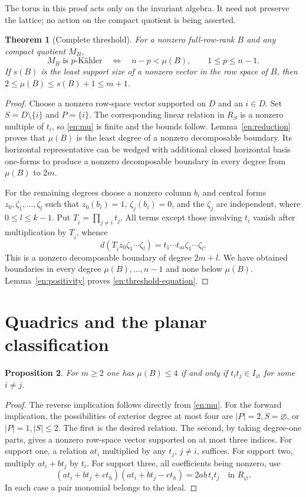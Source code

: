 \documentclass[12pt]{amsart}
\newcommand{\thmword}{Theorem}
\newcommand{\propword}{Proposition}
\newtheorem{thm}{\thmword}[section]
\newtheorem{prop}[thm]{\propword}
\theoremstyle{definition}
\theoremstyle{remark}
\numberwithin{equation}{section}
\begin{document}
The torus in this proof acts only on the invariant algebra. It need not
preserve the lattice; no action on the compact quotient is being asserted.

\begin{thm}[Complete threshold]\label{en:threshold}
For a nonzero full-row-rank $B$ and any compact quotient $M_B$,
\begin{equation}\label{en:threshold-equation}
 M_B\text{ is }p\text{-K\"ahler}
 \quad\Longleftrightarrow\quad n-p<\mu(B),\qquad 1\leq p\leq n-1.
\end{equation}
If $s(B)$ is the least support size of a nonzero vector in the row space
of $B$, then $2\leq\mu(B)\leq s(B)+1\leq m+1$.
\end{thm}
\begin{proof}
Choose a nonzero row-space vector supported on $D$ and an $i\in D$.
Set $S=D\setminus\{i\}$ and $P=\{i\}$. The corresponding linear relation
in $R_S$ is a nonzero multiple of $t_i$, so \eqref{en:mu} is finite and
the bounds follow.
Lemma~\ref{en:reduction} proves that $\mu(B)$ is the least degree of a
nonzero decomposable boundary. Its horizontal representative can be wedged
with additional closed horizontal basis one-forms to produce a nonzero
decomposable boundary in every degree from $\mu(B)$ to $2m$.

For the remaining degrees choose a nonzero column $b_i$ and central forms
$z_0,\zeta_1,\ldots,\zeta_l$ such that
$z_0(b_i)=1$, $\zeta_j(b_i)=0$, and the $\zeta_j$ are independent,
where $0\leq l\leq k-1$. Put $T_{\widehat i}=\prod_{j\ne i}t_j$.
All terms except those involving $t_i$ vanish after multiplication by
$T_{\widehat i}$, whence
\[
 d(T_{\widehat i}z_0\zeta_1\cdots\zeta_l)
   =t_1\cdots t_m\zeta_1\cdots\zeta_l.
\]
This is a nonzero decomposable boundary of degree $2m+l$.
We have obtained boundaries in every degree $\mu(B),\ldots,n-1$ and none
below $\mu(B)$. Lemma~\ref{en:positivity} proves \eqref{en:threshold-equation}.
\end{proof}

\section{Quadrics and the planar classification}
\begin{prop}\label{en:degree-four}
For $m\geq2$ one has $\mu(B)\leq4$ if and only if
$t_i t_j\in I_{\varnothing}$ for some $i\ne j$.
\end{prop}
\begin{proof}
The reverse implication follows directly from \eqref{en:mu}.
For the forward implication, the possibilities of exterior degree at most
four are $|P|=2,S=\varnothing$, or $|P|=1,|S|\leq2$.
The first is the desired relation. The second, by taking degree-one parts,
gives a nonzero row-space vector supported on at most three indices.
For support one, a relation $a t_i$ multiplied by any $t_j$, $j\ne i$,
suffices. For support two, multiply $a t_i+b t_j$ by $t_i$.
For support three, all coefficients being nonzero, use
\[
 (a t_i+b t_j+c t_h)(a t_i+b t_j-c t_h)=2ab\,t_i t_j
 \quad\text{in }R_{\varnothing}.
\]
In each case a pair monomial belongs to the ideal.
\end{proof}
\end{document}
